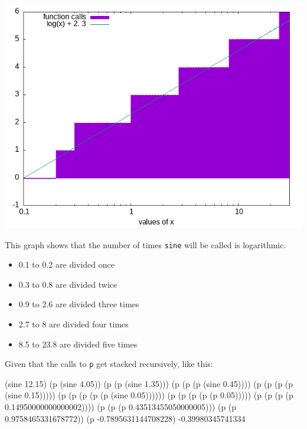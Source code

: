 \documentclass[
]{article}
\newenvironment{Shaded}{}{}
\newcommand{\FloatTok}[1]{\textcolor[rgb]{0.25,0.63,0.44}{#1}}
\newcommand{\NormalTok}[1]{#1}
\providecommand{\tightlist}{%
  \setlength{\itemsep}{0pt}\setlength{\parskip}{0pt}}
\begin{document}
\includegraphics{fig/1-15-step.png}

This graph shows that the number of times \texttt{sine} will be called
is logarithmic.

\begin{itemize}
\tightlist
\item
  0.1 to 0.2 are divided once
\item
  0.3 to 0.8 are divided twice
\item
  0.9 to 2.6 are divided three times
\item
  2.7 to 8 are divided four times
\item
  8.5 to 23.8 are divided five times
\end{itemize}

Given that the calls to \texttt{p} get stacked recursively, like this:

\begin{Shaded}
\begin{Highlighting}[]
\NormalTok{(sine }\FloatTok{12.15}\NormalTok{)}
\NormalTok{(p (sine }\FloatTok{4.05}\NormalTok{))}
\NormalTok{(p (p (sine }\FloatTok{1.35}\NormalTok{)))}
\NormalTok{(p (p (p (sine }\FloatTok{0.45}\NormalTok{))))}
\NormalTok{(p (p (p (p (sine }\FloatTok{0.15}\NormalTok{)))))}
\NormalTok{(p (p (p (p (p (sine }\FloatTok{0.05}\NormalTok{))))))}
\NormalTok{(p (p (p (p (p }\FloatTok{0.05}\NormalTok{)))))}
\NormalTok{(p (p (p (p }\FloatTok{0.14950000000000002}\NormalTok{))))}
\NormalTok{(p (p (p }\FloatTok{0.43513455050000005}\NormalTok{)))}
\NormalTok{(p (p }\FloatTok{0.9758465331678772}\NormalTok{))}
\NormalTok{(p {-}}\FloatTok{0.7895631144708228}\NormalTok{)}
\NormalTok{{-}}\FloatTok{0.39980345741334}
\end{Highlighting}
\end{Shaded}
\end{document}
